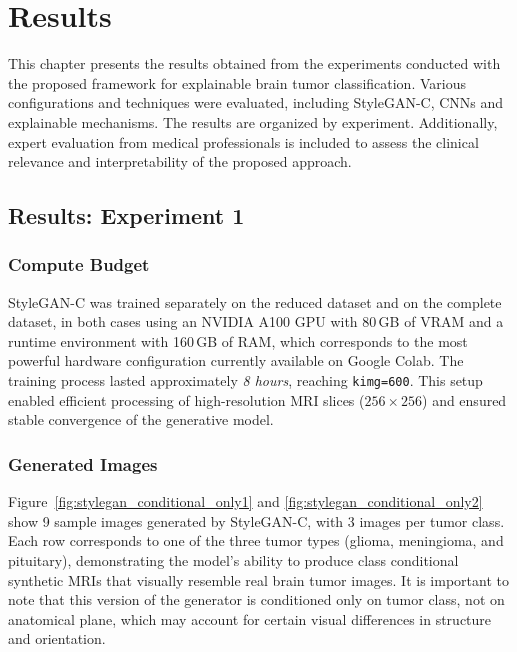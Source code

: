\chapter{Results}



This chapter presents the results obtained from the experiments conducted with the proposed framework for explainable brain tumor classification. Various configurations and techniques were evaluated, including StyleGAN-C, CNNs and explainable mechanisms. The results are organized by experiment. Additionally, expert evaluation from medical professionals is included to assess the clinical relevance and interpretability of the proposed approach.


\section{Results: Experiment 1}




\subsection{Compute Budget} 

StyleGAN-C was trained separately on the reduced dataset and on the complete dataset, in both cases using an NVIDIA A100 GPU with 80\,GB of VRAM and a runtime environment with 160\,GB of RAM, which corresponds to the most powerful hardware configuration currently available on Google Colab. The training process lasted approximately \textit{8 hours}, reaching \texttt{kimg=600}. This setup enabled efficient processing of high-resolution MRI slices ($256 \times 256$) and ensured stable convergence of the generative model.

\subsection{Generated Images} Figure~\ref{fig:stylegan_conditional_only1} and \ref{fig:stylegan_conditional_only2} show 9 sample images generated by StyleGAN-C, with 3 images per tumor class. Each row corresponds to one of the three tumor types (glioma, meningioma, and pituitary), demonstrating the model's ability to produce class conditional synthetic MRIs that visually resemble real brain tumor images. It is important to note that this version of the generator is conditioned only on tumor class, not on anatomical plane, which may account for certain visual differences in structure and orientation.

